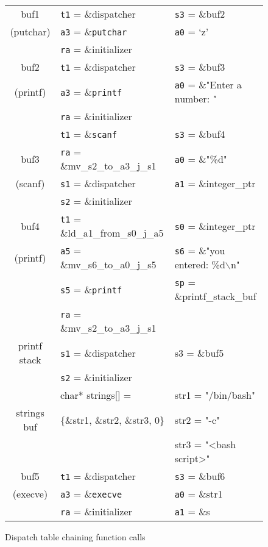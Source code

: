 \begin{figure}
    \caption{Dispatch table chaining function calls}
    \label{dispatch table}
    \begin{center}
    \scriptsize
    \begin{tabular}{|c|l|l|}
    \hline
    buf1        &\verb|t1| = \&dispatcher              &\verb|s3| = \&buf2\\
    (putchar)   &\verb|a3| = \&\verb|putchar|          &\verb|a0| = ‘z’\\
                &\verb|ra| = \&initializer             &\\
    \hline
    buf2        &\verb|t1| = \&dispatcher              &\verb|s3| = \&buf3\\
    (printf)    &\verb|a3| = \&\verb|printf|           &\verb|a0| = \&"Enter a number: "\\
                &\verb|ra| = \&initializer             &\\
    \hline
                &\verb|t1| = \&\verb|scanf|            &\verb|s3| = \&buf4 \\
    buf3        &\verb|ra| = \&mv\_s2\_to\_a3\_j\_s1   &\verb|a0| = \&"\%d"\\
    (scanf)     &\verb|s1| = \&dispatcher              &\verb|a1| = \&integer\_ptr\\
                &\verb|s2| = \&initializer             &\\
    \hline
    buf4        &\verb|t1| = \&ld\_a1\_from\_s0\_j\_a5 &\verb|s0| = \&integer\_ptr\\
    (printf)    &\verb|a5| = \&mv\_s6\_to\_a0\_j\_s5   &\verb|s6| = \&"you entered: \%d$\backslash$n"\\
                &\verb|s5| = \&\verb|printf|           &\verb|sp| = \&printf\_stack\_buf\\
    \hline
                &\verb|ra| = \&mv\_s2\_to\_a3\_j\_s1   &\\
    printf stack&\verb|s1| = \&dispatcher              &s3 = \&buf5\\
                &\verb|s2| = \&initializer             &\\
    \hline
                &char* strings[] =                     &str1 = "/bin/bash"\\
    strings buf &\{\&str1, \&str2, \&str3, 0\}         &str2 = "-c"\\
                &                                      &str3 = "<bash script>"\\
    \hline
    buf5        &\verb|t1| = \&dispatcher              &\verb|s3| = \&buf6\\
    (execve)    &\verb|a3| = \&\verb|execve|           &\verb|a0| = \&str1\\
                &\verb|ra| = \&initializer             &\verb|a1| = \&s\\
    \hline
    \end{tabular}
    \end{center}
\end{figure}

